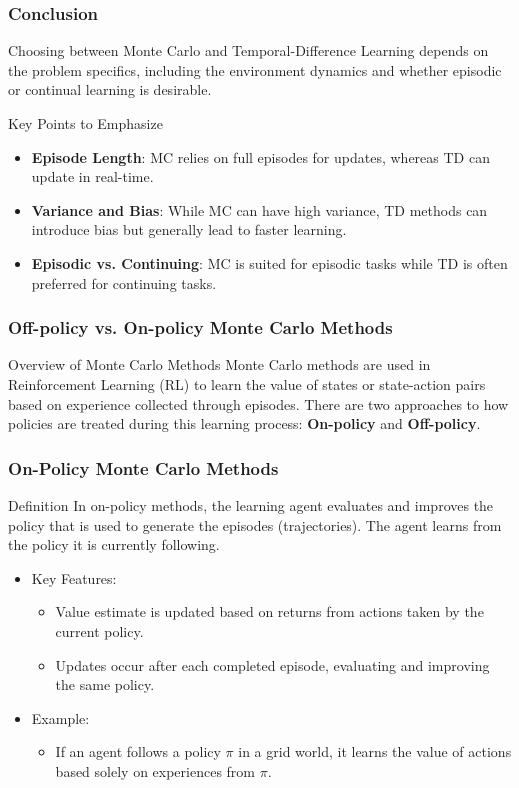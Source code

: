 \documentclass[aspectratio=169]{beamer}
\begin{document}
\begin{frame}[fragile]
  \frametitle{Conclusion}
  Choosing between Monte Carlo and Temporal-Difference Learning depends on the problem specifics, including the environment dynamics and whether episodic or continual learning is desirable. 
  \begin{block}{Key Points to Emphasize}
    \begin{itemize}
      \item \textbf{Episode Length}: MC relies on full episodes for updates, whereas TD can update in real-time.
      \item \textbf{Variance and Bias}: While MC can have high variance, TD methods can introduce bias but generally lead to faster learning.
      \item \textbf{Episodic vs. Continuing}: MC is suited for episodic tasks while TD is often preferred for continuing tasks.
    \end{itemize}
  \end{block}
\end{frame}

\begin{frame}[fragile]
  \frametitle{Off-policy vs. On-policy Monte Carlo Methods}
  \begin{block}{Overview of Monte Carlo Methods}
    Monte Carlo methods are used in Reinforcement Learning (RL) to learn the value of states or state-action pairs based on experience collected through episodes. There are two approaches to how policies are treated during this learning process: \textbf{On-policy} and \textbf{Off-policy}.
  \end{block}
\end{frame}

\begin{frame}[fragile]
  \frametitle{On-Policy Monte Carlo Methods}
  \begin{block}{Definition}
    In on-policy methods, the learning agent evaluates and improves the policy that is used to generate the episodes (trajectories). The agent learns from the policy it is currently following.
  \end{block}
  \begin{itemize}
    \item Key Features:
    \begin{itemize}
      \item Value estimate is updated based on returns from actions taken by the current policy.
      \item Updates occur after each completed episode, evaluating and improving the same policy.
    \end{itemize}
    \item Example:
    \begin{itemize}
      \item If an agent follows a policy $\pi$ in a grid world, it learns the value of actions based solely on experiences from $\pi$.
    \end{itemize}
  \end{itemize}
\end{frame}
\end{document}
